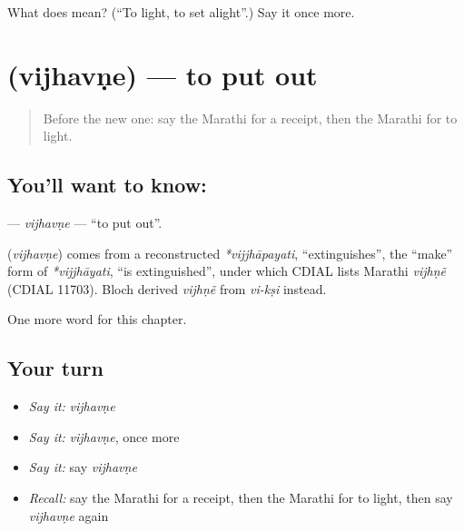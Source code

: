 \begin{tcolorbox}[breakable,colback=teal!4,colframe=teal!35!black,title={Before you move on}]
What does  mean? (\textquotedblleft{}To light, to set alight\textquotedblright{}.) Say it once more.
\end{tcolorbox}
\section[\texorpdfstring{\mr{विझवणे} (vijhavṇe)}{विझवणे (vijhavṇe)}]{ (vijhavṇe) — to put out}

\label{lesson:MR-C162-vijhavne}



\begin{quote}
Before the new one: say the Marathi for a receipt, then the Marathi for to light.
\end{quote}

\subsection*{You'll want to know: }
\textbf{} — \emph{vijhavṇe} — \textquotedblleft{}to put out\textquotedblright{}.

\begin{cousinweb}
\textbf{} (\emph{vijhavṇe}) comes from a reconstructed \emph{*vijjhāpayati}, \textquotedblleft{}extinguishes\textquotedblright{}, the \textquotedblleft{}make\textquotedblright{} form of \emph{*vijjhāyati}, \textquotedblleft{}is extinguished\textquotedblright{}, under which CDIAL lists Marathi \emph{vijhṇẽ} (CDIAL 11703). Bloch derived \emph{vijhṇẽ} from \emph{vi-kṣi} instead.
\end{cousinweb}

\begin{grammarlens}[title={What you've built}]
One more word for this chapter.
\end{grammarlens}

\subsection*{Your turn}
\begin{itemize}
\raggedright
  \item \emph{Say it:} \emph{vijhavṇe}
  \item \emph{Say it:} \emph{vijhavṇe}, once more
  \item \emph{Say it:} say \emph{vijhavṇe}
  \item \emph{Recall:} say the Marathi for a receipt, then the Marathi for to light, then say \emph{vijhavṇe} again
\end{itemize}

